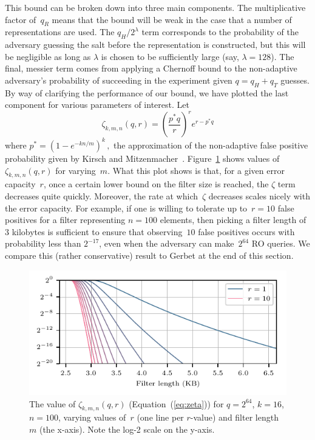 This bound can be broken down into three main components. The multiplicative
factor of~$q_R$ means that the bound will be weak in the case that a number of
representations are used. The $q_H/2^\lambda$ term corresponds to the
probability of the adversary guessing the salt before the representation is
constructed, but this will be negligible as long as $\lambda$ is chosen to be
sufficiently large (say, $\lambda=128$). The final, messier term comes from
applying a Chernoff bound to the non-adaptive adversary's probability of
succeeding in the experiment given $q = q_H+q_T$ guesses.
%
By way of clarifying the performance of our bound, we have plotted the last
component for various parameters of interest. Let
%
\begin{equation}\label{eq:zeta}
  \zeta_{k,m,n}(q,r) = \left(\frac{p^*q}{r}\right)^re^{r-p^*q}
\end{equation}
%
where
$
  p^* = (1-e^{-kn/m})^k \,,
$
the approximation of the non-adaptive false positive probability given by Kirsch
and Mitzenmacher~\cite{kirsch2006less}.
%
Figure~\ref{fig:bf-bound} shows values
of~$\zeta_{k,m,n}(q,r)$ for varying~$m$.
%
What this plot shows is that, for a given error capacity~$r$, once a certain lower
bound on the filter size is reached, the $\zeta$ term decreases quite quickly.
Moreover, the rate at which~$\zeta$ decreases scales nicely with the error
capacity.  For example, if one is willing to tolerate up to~$r=10$ false
positives for a filter representing $n=100$ elements, then picking a filter
length of $3$ kilobytes is sufficient to ensure that observing~$10$ false
positives occurs with probability less than $2^{-17}$, even when the adversary
can make~$2^{64}$ RO queries.
%
We compare this (rather conservative) result to Gerbet \etal at the end of this section.

\begin{figure}
  \hspace*{-10pt}
  \includegraphics{fig/bf-bound}
  \vspace{-24pt}
  \caption{
    The value of $\zeta_{k,m,n}(q,r)$ (Equation~(\ref{eq:zeta})) for $q=2^{64}$,
    $k=16$, $n=100$, varying values of~$r$ (one line per $r$-value) and filter
    length~$m$ (the x-axis).  Note the log-2 scale on the y-axis.
  }
  \label{fig:bf-bound}
\end{figure}

